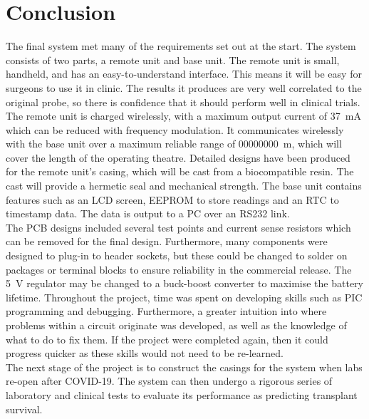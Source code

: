 \section{Conclusion}
The final system met many of the requirements set out at the start. The system consists of two parts, a remote unit and base unit. The remote unit is small, handheld, and has an easy-to-understand interface. This means it will be easy for surgeons to use it in clinic. The results it produces are very well correlated to the original probe, so there is confidence that it should perform well in clinical trials. The remote unit is charged wirelessly, with a maximum output current of \SI{37}{\milli\ampere} which can be reduced with frequency modulation. It communicates wirelessly with the base unit over a maximum reliable range of \SI{00000000}{\metre}, which will cover the length of the operating theatre. Detailed designs have been produced for the remote unit's casing, which will be cast from a biocompatible resin. The cast will provide a hermetic seal and mechanical strength. The base unit contains features such as an LCD screen, EEPROM to store readings and an RTC to timestamp data. The data is output to a PC over an RS232 link.\\

The PCB designs included several test points and current sense resistors which can be removed for the final design. Furthermore, many components were designed to plug-in to header sockets, but these could be changed to solder on packages or terminal blocks to ensure reliability in the commercial release. The \SI{5}{\volt} regulator may be changed to a buck-boost converter to maximise the battery lifetime. Throughout the project, time was spent on developing skills such as PIC programming and debugging. Furthermore, a greater intuition into where problems within a circuit originate was developed, as well as the knowledge of what to do to fix them. If the project were completed again, then it could progress quicker as these skills would not need to be re-learned. \\

The next stage of the project is to construct the casings for the system when labs re-open after COVID-19. The system can then undergo a rigorous series of laboratory and clinical tests to evaluate its performance as predicting transplant survival.\\